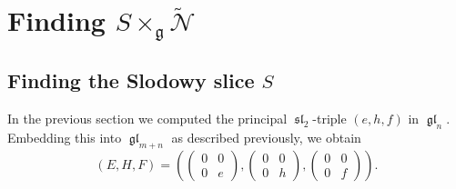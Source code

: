 \documentclass[12pt,psamsfonts]{article}
\DeclareMathOperator{\gl}{\mathfrak{gl}}
\DeclareMathOperator{\spl}{\mathfrak{sl}}
\begin{document}

\section{Finding \texorpdfstring{\(S \times_\mathfrak{g} \widetilde{\mathcal{N}}\)}{S x\_g N}}
\subsection{Finding the Slodowy slice \texorpdfstring{\(S\)}{S}}
In the previous section we computed the principal \(\spl_2\)-triple \((e, h, f)\) in \(\gl_n\).
Embedding this into \(\gl_{m + n}\) as described previously, we obtain
\[(E, H, F) = \left(\begin{pmatrix}0 & 0 \\0 & e\end{pmatrix}, \begin{pmatrix}0 & 0 \\0 & h\end{pmatrix}, \begin{pmatrix}0 & 0 \\0 & f\end{pmatrix}\right).\]
\end{document}
